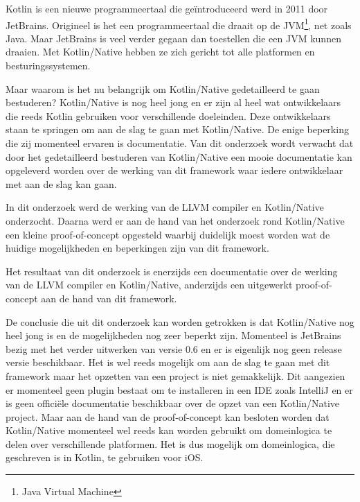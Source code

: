 Kotlin is een nieuwe programmeertaal die geïntroduceerd werd in 2011 door JetBrains. Origineel is het een programmeertaal die draait op de JVM\footnote{Java Virtual Machine}, net zoals Java. Maar JetBrains is veel verder gegaan dan toestellen die een JVM kunnen draaien. Met Kotlin/Native hebben ze zich gericht tot alle platformen en besturingssystemen. 


Maar waarom is het nu belangrijk om Kotlin/Native gedetailleerd te gaan bestuderen? Kotlin/Native is nog heel jong en er zijn al heel wat ontwikkelaars die reeds Kotlin gebruiken voor verschillende doeleinden. Deze ontwikkelaars staan te springen om aan de slag te gaan met Kotlin/Native. De enige beperking die zij momenteel ervaren is documentatie. Van dit onderzoek wordt verwacht dat door het gedetailleerd bestuderen van Kotlin/Native een mooie documentatie kan opgeleverd worden over de werking van dit framework waar iedere ontwikkelaar met aan de slag kan gaan.

In dit onderzoek werd de werking van de LLVM compiler en Kotlin/Native onderzocht. Daarna werd er aan de hand van het onderzoek rond Kotlin/Native een kleine proof-of-concept opgesteld waarbij duidelijk moest worden wat de huidige mogelijkheden en beperkingen zijn van dit framework.

Het resultaat van dit onderzoek is enerzijds een documentatie over de werking van de LLVM compiler en Kotlin/Native, anderzijds een uitgewerkt proof-of-concept aan de hand van dit framework.

De conclusie die uit dit onderzoek kan worden getrokken is dat Kotlin/Native nog heel jong is en de mogelijkheden nog zeer beperkt zijn. Momenteel is JetBrains bezig met het verder uitwerken van versie 0.6 en er is eigenlijk nog geen release versie beschikbaar. Het is wel reeds mogelijk om aan de slag te gaan met dit framework maar het opzetten van een project is niet gemakkelijk. Dit aangezien er momenteel geen plugin bestaat om te installeren in een IDE zoals IntelliJ en er is geen officiële documentatie beschikbaar over de opzet van een Kotlin/Native project. Maar aan de hand van de proof-of-concept kan besloten worden dat Kotlin/Native momenteel wel reeds kan worden gebruikt om domeinlogica te delen over verschillende platformen. Het is dus mogelijk om domeinlogica, die geschreven is in Kotlin, te gebruiken voor iOS.

